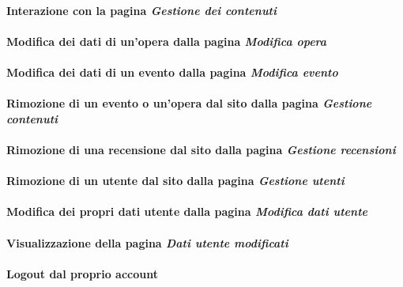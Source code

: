 \paragraph{Interazione con la pagina \textit{Gestione dei contenuti}}
\label{analisi-casi-uso-attori-principali-utente-amministratore-4}

\paragraph{Modifica dei dati di un'opera dalla pagina \textit{Modifica opera}}
\label{analisi-casi-uso-attori-principali-utente-amministratore-5}

\paragraph{Modifica dei dati di un evento dalla pagina \textit{Modifica evento}}
\label{analisi-casi-uso-attori-principali-utente-amministratore-6}

\paragraph{Rimozione di un evento o un'opera dal sito dalla pagina \textit{Gestione contenuti}}
\label{analisi-casi-uso-attori-principali-utente-amministratore-7}

\paragraph{Rimozione di una recensione dal sito dalla pagina \textit{Gestione recensioni}}
\label{analisi-casi-uso-attori-principali-utente-amministratore-8}

\paragraph{Rimozione di un utente dal sito dalla pagina \textit{Gestione utenti}}
\label{analisi-casi-uso-attori-principali-utente-amministratore-9}

\paragraph{Modifica dei propri dati utente dalla pagina \textit{Modifica dati utente}}
\label{analisi-casi-uso-attori-principali-utente-amministratore-10}

\paragraph{Visualizzazione della pagina \textit{Dati utente modificati}}
\label{analisi-casi-uso-attori-principali-utente-amministratore-11}

\paragraph{Logout dal proprio account}
\label{analisi-casi-uso-attori-principali-utente-amministratore-12}
